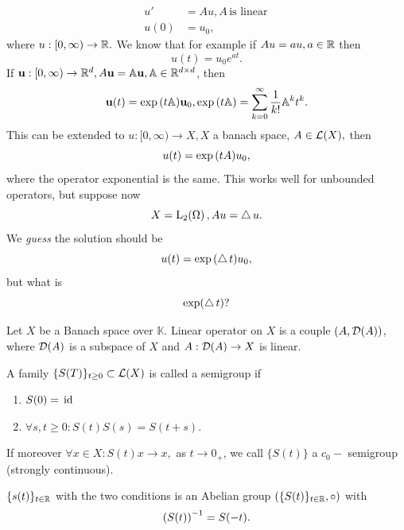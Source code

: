 \documentclass{article}
\begin{document}
\begin{align*}
	u' &= Au, A \, \text{is linear} \,\\
	u(0) &= u_0,
\end{align*}
where $u:[0, \infty) \to {\mathbb R}.$ We know that for example if $Au = au, a \in {\mathbb R}$ then
\[
	u(t) = u_0 e^{at}.
\]
If $\vb{u}: [0,\infty) \to {\mathbb R}^{d}, A\vb{u} = \mathbb{A}\vb{u}, \mathbb{A} \in {\mathbb R}^{d \times d}$, then
\[
	\vb{u}(t) = \exp\qty(t\mathbb{A})\vb{u}_0, \exp\qty(t \mathbb{A}) = \sum_{k=0}^{\infty}\frac{1}{k!}\mathbb{A}^k t^k.
\]
This can be extended to $u:[0, \infty) \to X, X$ a banach space, $A \in \mathcal{L}\qty(X), $ then
\[
	u(t) = \exp\qty(tA)u_0,
\]
where the operator exponential is the same. This works well for unbounded operators, but suppose now
\[
	X = \LpSet[2]{\Omega}, Au = \laplace u.
\]
We \textit{guess} the solution should be
\[
	u(t) = \exp\qty(\operatorname{\bigtriangleup} t)u_0,
\]
but what is
\[
	\exp(\operatorname{\bigtriangleup} t)?
\]
\begin{definition}					Let $X$ be a Banach space over $\mathbb{K}$. Linear operator on $X$ is a couple $(A, \mathcal{D}\qty(A))$, where $\mathcal{D}\qty(A)$ is a subspace of $X$ and $A: \mathcal{D}\qty(A) \to X$ is linear.
\end{definition}

\begin{definition}
	A family $\{S(T)\}_{t \geq 0} \subset \mathcal{L}\qty(X)$ is called a semigroup if
	\begin{enumerate}
		\item $S\qty(0) = \, \text{id} \,$
		\item $\forall s,t \geq 0: S(t) S(s) = S(t+s).$
	\end{enumerate}
	If moreover $\forall x \in X: S(t)x \to x,$ as $t\to 0_+$, we call $\{S(t)\}$ a $c_0-$ semigroup (strongly continuous).
\end{definition}
\begin{remark}
	$\{s(t)\}_{t\in {\mathbb R}}$ with the two conditions is an Abelian group $\qty(\{S(t)\}_{t\in {\mathbb R}}, \circ)$ with
	\begin{equation}
		\qty(S(t))^{-1} = S\qty(-t).
	\end{equation}
\end{remark}
\end{document}
